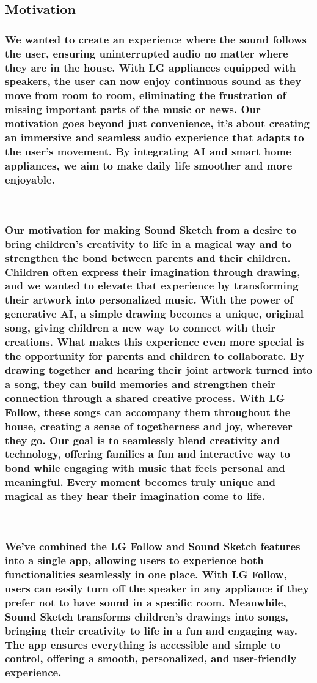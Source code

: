 \documentclass[conference]{IEEEtran}
\begin{document}
\subsection{Motivation}

\subsubsection{We wanted to create an experience where the sound follows the user, ensuring uninterrupted audio no matter where they are in the house. With LG appliances equipped with speakers, the user can now enjoy continuous sound as they move from room to room, eliminating the frustration of missing important parts of the music or news.
Our motivation goes beyond just convenience, it’s about creating an immersive and seamless audio experience that adapts to the user's movement. By integrating AI and smart home appliances, we aim to make daily life smoother and more enjoyable.}
\

\subsubsection{Our motivation for making Sound Sketch from a desire to bring children's creativity to life in a magical way and to strengthen the bond between parents and their children. Children often express their imagination through drawing, and we wanted to elevate that experience by transforming their artwork into personalized music. With the power of generative AI, a simple drawing becomes a unique, original song, giving children a new way to connect with their creations.
What makes this experience even more special is the opportunity for parents and children to collaborate. By drawing together and hearing their joint artwork turned into a song, they can build memories and strengthen their connection through a shared creative process. With LG Follow, these songs can accompany them throughout the house, creating a sense of togetherness and joy, wherever they go.
Our goal is to seamlessly blend creativity and technology, offering families a fun and interactive way to bond while engaging with music that feels personal and meaningful. Every moment becomes truly unique and magical as they hear their imagination come to life.}


\
\subsubsection{We've combined the LG Follow and Sound Sketch features into a single app, allowing users to experience both functionalities seamlessly in one place. With LG Follow, users can easily turn off the speaker in any appliance if they prefer not to have sound in a specific room. Meanwhile, Sound Sketch transforms children's drawings into songs, bringing their creativity to life in a fun and engaging way. The app ensures everything is accessible and simple to control, offering a smooth, personalized, and user-friendly experience.}
\end{document}
